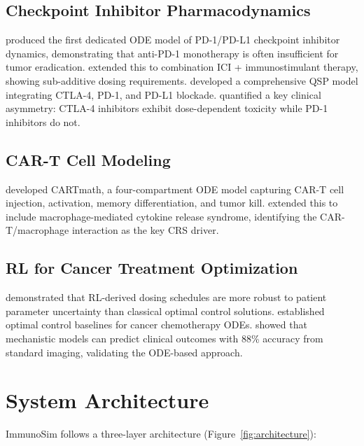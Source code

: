 \documentclass[11pt,a4paper]{article}
\begin{document}
\subsection{Checkpoint Inhibitor Pharmacodynamics}

\citet{Nikolopoulou2018} produced the first dedicated ODE model of PD-1/PD-L1 checkpoint inhibitor dynamics, demonstrating that anti-PD-1 monotherapy is often insufficient for tumor eradication. \citet{Nikolopoulou2021} extended this to combination ICI + immunostimulant therapy, showing sub-additive dosing requirements. \citet{Milberg2019} developed a comprehensive QSP model integrating CTLA-4, PD-1, and PD-L1 blockade. \citet{Shulgin2020} quantified a key clinical asymmetry: CTLA-4 inhibitors exhibit dose-dependent toxicity while PD-1 inhibitors do not.

\subsection{CAR-T Cell Modeling}

\citet{Barros2021} developed CARTmath, a four-compartment ODE model capturing CAR-T cell injection, activation, memory differentiation, and tumor kill. \citet{Santurio2025} extended this to include macrophage-mediated cytokine release syndrome, identifying the CAR-T/macrophage interaction as the key CRS driver.

\subsection{RL for Cancer Treatment Optimization}

\citet{Eastman2021} demonstrated that RL-derived dosing schedules are more robust to patient parameter uncertainty than classical optimal control solutions. \citet{Engelhart2011} established optimal control baselines for cancer chemotherapy ODEs. \citet{Butner2020} showed that mechanistic models can predict clinical outcomes with 88\% accuracy from standard imaging, validating the ODE-based approach.

\section{System Architecture}

ImmunoSim follows a three-layer architecture (Figure~\ref{fig:architecture}):
\end{document}
